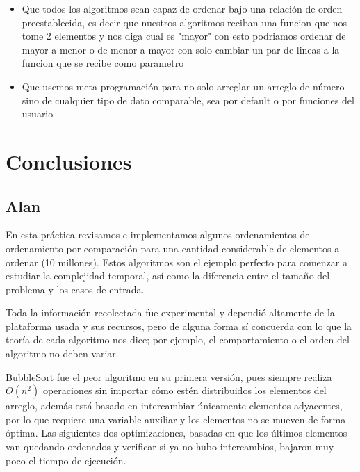 \documentclass[12pt, fleqn]{report}                             %
\theoremstyle{break}                                            %
\begin{document}
	    \begin{itemize}\setlength\itemsep{0em}
	        \item Que todos los algoritmos sean capaz de ordenar  bajo una relación de orden preestablecida, es decir que nuestros algoritmos reciban una funcion que 
	        nos tome 2 elementos y nos diga cual es "mayor" con esto podriamos ordenar de mayor a menor
	        o de menor a mayor con solo cambiar un par de lineas a la funcion que se recibe como parametro
	        
	        \item  Que usemos meta programación para no solo arreglar un arreglo de número sino
	        de cualquier tipo de dato comparable, sea por default o por funciones del usuario
	    \end{itemize}
	
	\clearpage
	
	\section{Conclusiones}
	
    	\subsection{Alan}
    	    En esta práctica revisamos e implementamos algunos ordenamientos de ordenamiento por comparación para una cantidad considerable de elementos a ordenar (10 millones). Estos algoritmos son el ejemplo perfecto para comenzar a estudiar la complejidad temporal, así como la diferencia entre el tamaño del problema y los casos de entrada.
    	    
    	    Toda la información recolectada fue experimental y dependió altamente de la plataforma usada y sus recursos, pero de alguna forma sí concuerda con lo que la teoría de cada algoritmo nos dice; por ejemplo, el comportamiento o el orden del algoritmo no deben variar.
    	    
    	    BubbleSort fue el peor algoritmo en su primera versión, pues siempre realiza $O(n^2)$ operaciones sin importar cómo estén distribuidos los elementos del arreglo, además está basado en intercambiar únicamente elementos adyacentes, por lo que requiere una variable auxiliar y los elementos no se mueven de forma óptima. Las siguientes dos optimizaciones, basadas en que los últimos elementos van quedando ordenados y verificar si ya no hubo intercambios, bajaron muy poco el tiempo de ejecución.
    	    
\end{document}
